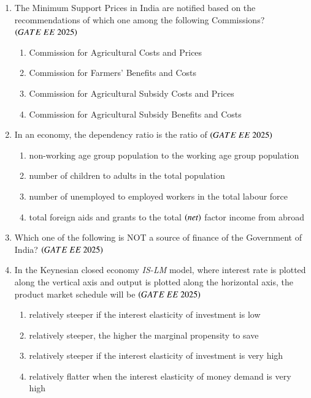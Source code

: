 \documentclass[journal,12pt,onecolumn]{IEEEtran}
\theoremstyle{remark}
\begin{document}
\begin{enumerate}
\item The Minimum Support Prices in India are notified based on the recommendations of which one among the following Commissions?
\hfill $\brak{GATE\ EE\ 2025}$
    \begin{enumerate}
    \item Commission for Agricultural Costs and Prices
    \item Commission for Farmers' Benefits and Costs
    \item Commission for Agricultural Subsidy Costs and Prices
    \item Commission for Agricultural Subsidy Benefits and Costs
 \end{enumerate}
 
\item In an economy, the dependency ratio is the ratio of
\hfill $\brak{GATE\ EE\ 2025}$
    \begin{enumerate}
    \item non-working age group population to the working age group population
    \item number of children to adults in the total population
    \item number of unemployed to employed workers in the total labour force
    \item total foreign aids and grants to the total  $\left(net\right)$ factor income from abroad
  \end{enumerate}
 
\item Which one of the following is NOT a source of finance of the Government of India?
\hfill $\brak{GATE\ EE\ 2025}$
    \begin{enumerate}
       \end{enumerate}
 
\item In the Keynesian closed economy \textit{IS-LM} model, where interest rate is plotted along the vertical axis and output is plotted along the horizontal axis, the product market schedule will be
\hfill $\brak{GATE\ EE\ 2025}$
    \begin{enumerate}
    \item relatively steeper if the interest elasticity of investment is low
    \item relatively steeper, the higher the marginal propensity to save
    \item relatively steeper if the interest elasticity of investment is very high
    \item relatively flatter when the interest elasticity of money demand is very high
    \end{enumerate}
 

\end{enumerate}
\end{document}
